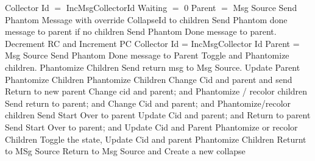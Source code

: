 \documentclass{article}
\begin{document}
\begin{algorithmic}[1]
\State Collector Id $=$ IncMsgCollectorId
\State Waiting $=$ 0
\State Parent $=$ Msg Source
\State Send Phantom Message with override CollapseId to children
\State Send Phantom done message to parent if no children
\Else
\State Send Phantom Done message to parent.
\EndIf
\Else
\State Decrement RC and Increment PC
\State Collector Id = IncMsgCollector Id
\State Parent = Msg Source
\State Send Phantom Done message to Parent
\State Toggle and Phantomize children.
\State Phantomize Children
\EndIf
{}
\State Send return msg to Msg Source.
\State Update Parent
\State Phantomize Children
\State Phantomize Children
\EndIf
{}
\State Change Cid and parent and send Return to new parent
\State Change cid and parent; and Phantomize / recolor children
\State Send return to parent; and Change Cid and parent; and Phantomize/recolor children
\State Send Start Over to parent
\State Update Cid and parent; and Return to parent
\State Send Start Over to parent; and Update Cid and Parent
\State Phantomize or recolor Children
\State Toggle the state, Update Cid and parent
\State Phantomize Children
\EndIf
{}
\State Returnt to MSg Source
\State Return to Msg Source and Create a new collapse
\EndIf
\EndIf
\EndIf
\EndProcedure
\end{algorithmic}
	
\end{document}
